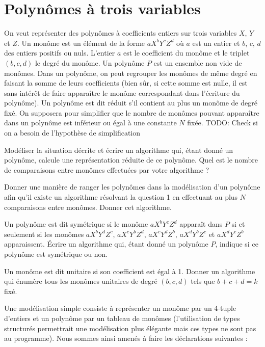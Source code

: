 \renewcommand{\SourceFile}{7-arithmetique-et-calculs-numeriques/src/7-3.ml}

\section{Polynômes à trois variables}

On veut représenter des polynômes à coefficients entiers sur trois variables $X$, $Y$ et $Z$. Un monôme est un élément de la forme $aX^bY^cZ^d$ où $a$ est un entier et $b$, $c$, $d$ des entiers positifs ou nuls. L'entier $a$ est le coefficient du monôme et le triplet $(b,c,d)$ le degré du monôme. Un polynôme $P$ est un ensemble non vide de monômes. Dans un polynôme, on peut regrouper les monômes de même degré en faisant la somme de leurs coefficients (bien sûr, si cette somme est nulle, il est sans intérêt de faire apparaître le monôme correspondant dans l'écriture du polynôme). Un polynôme est dit réduit s'il contient au plus un monôme de degré fixé. On supposera pour simplifier que le nombre de monômes pouvant apparaître dans un polynôme est inférieur ou égal à une constante $N$ fixée.
TODO: Check si on a besoin de l'hypothèse de simplification
\newpage

\Q
Modéliser la situation décrite et écrire un algorithme qui, étant donné un polynôme, calcule une représentation réduite de ce polynôme. Quel est le nombre de comparaisons entre monômes effectuées par votre algorithme ?

\Q
Donner une manière de ranger les polynômes dans la modélisation d'un polynôme afin qu'il existe un algorithme résolvant la question 1 en effectuant au plus $N$ comparaisons entre monômes. Donner cet algorithme.

\Q
Un polynôme est dit symétrique si le monôme $aX^bY^cZ^d$ apparaît dans $P$ si et seulement si les monômes $aX^bY^dZ^c$, $aX^cY^bZ^d$, $aX^cY^dZ^b$, $aX^dY^bZ^c$ et $aX^dY^cZ^b$ apparaissent. Écrire un algorithme qui, étant donné un polynôme $P$, indique si ce polynôme est symétrique ou non.

\Q
Un monôme est dit unitaire si son coefficient est égal à 1. Donner un algorithme qui énumère tous les monômes unitaires de degré $(b,c,d)$ tels que $b+c+d=k$ fixé.

\Corrige

\Q
Une modélisation simple consiste à représenter un monôme par un 4-tuple d'entiers et un polynôme par un tableau de monômes (l'utilisation de types structurés permettrait une modélisation plus élégante mais ces types ne sont pas au programme). Nous sommes ainsi amenés à faire les déclarations suivantes :

